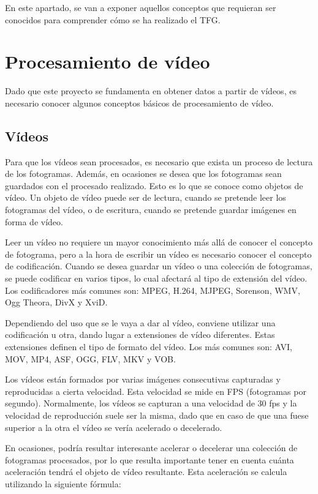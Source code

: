 
En este apartado, se van a exponer aquellos conceptos que requieran ser conocidos para comprender cómo se ha realizado el TFG.

\section{Procesamiento de vídeo}
Dado que este proyecto se fundamenta en obtener datos a partir de vídeos, es necesario conocer algunos conceptos básicos de procesamiento de vídeo.

\subsection{Vídeos}
Para que los vídeos sean procesados, es necesario que exista un proceso de lectura de los fotogramas. Además, en ocasiones se desea que los fotogramas sean guardados con el procesado realizado. Esto es lo que se conoce como objetos de vídeo. Un objeto de vídeo puede ser de lectura, cuando se pretende leer los fotogramas del vídeo, o de escritura, cuando se pretende guardar imágenes en forma de vídeo.

Leer un vídeo no requiere un mayor conocimiento más allá de conocer el concepto de fotograma, pero a la hora de escribir un vídeo es necesario conocer el concepto de codificación. Cuando se desea guardar un vídeo o una colección de fotogramas, se puede codificar en varios tipos, lo cual afectará al tipo de extensión del vídeo. Los codificadores más comunes son: MPEG, H.264, MJPEG, Sorenson, WMV, Ogg Theora, DivX y XviD.

Dependiendo del uso que se le vaya a dar al vídeo, conviene utilizar una codificación u otra, dando lugar a extensiones de vídeo diferentes. Estas extensiones definen el tipo de formato del vídeo. Los más comunes son: AVI, MOV, MP4, ASF, OGG, FLV, MKV y VOB.

Los vídeos están formados por varias imágenes consecutivas capturadas y reproducidas a cierta velocidad. Esta velocidad se mide en FPS (fotogramas por segundo). Normalmente, los vídeos se capturan a una velocidad de 30 fps y la velocidad de reproducción suele ser la misma, dado que en caso de que una fuese superior a la otra el vídeo se vería acelerado o decelerado. 

En ocasiones, podría resultar interesante acelerar o decelerar una colección de fotogramas procesados, por lo que resulta importante tener en cuenta cuánta aceleración tendrá el objeto de vídeo resultante. Esta aceleración se calcula utilizando la siguiente fórmula:

